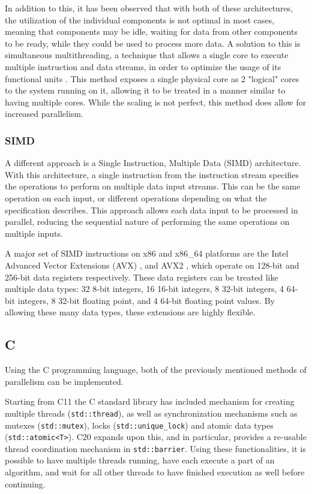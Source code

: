 \documentclass[12pt,dvipsnames]{article}
\newcommand{\icpp}[1]{\texttt{#1}}
\newcommand{\Rplus}{\protect\hspace{-.1em}\protect\raisebox{.35ex}{\smaller{\smaller\textbf{+}}}}
\newcommand{\Cpp}{\mbox{C\Rplus\Rplus}\xspace}
\newcommand{\CppXI}{\mbox{C\Rplus\Rplus11}\xspace}
\newcommand{\CppXX}{\mbox{C\Rplus\Rplus20}\xspace}
\begin{document}
In addition to this, it has been observed that with both of these architectures, the utilization of the individual components is not optimal in most cases, meaning that components may be idle, waiting for data from other components to be ready, while they could be used to process more data. A solution to this is simultaneous multithreading, a technique that allows a single core to execute multiple instruction and data streams, in order to optimize the usage of its functional units \cite{smt}. This method exposes a single physical core as 2 "logical" cores to the system running on it, allowing it to be treated in a manner similar to having multiple cores. While the scaling is not perfect, this method does allow for increased parallelism.

\clearpage

\subsubsection{SIMD}
A different approach is a Single Instruction, Multiple Data (SIMD) architecture. With this architecture, a single instruction from the instruction stream specifies the operations to perform on multiple data input streams. This can be the same operation on each input, or different operations depending on what the specification describes. This approach allows each data input to be processed in parallel, reducing the sequential nature of performing the same operations on multiple inputs.

A major set of SIMD instructions on x86 and x86\_64 platforms are the Intel Advanced Vector Extensions (AVX) \cite{Lomont11introductionto}, and AVX2 \cite{haswell}, which operate on 128-bit and 256-bit data registers respectively. These data registers can be treated like multiple data types: 32 8-bit integers, 16 16-bit integers, 8 32-bit integers, 4 64-bit integers, 8 32-bit floating point, and 4 64-bit floating point values. By allowing these many data types, these extensions are highly flexible.

\subsection{\texorpdfstring{\Cpp}{C++}}
Using the \Cpp programming language, both of the previously mentioned methods of parallelism can be implemented.

Starting from \CppXI the \Cpp standard library has included mechanism for creating multiple threads (\icpp{std::thread}), as well as synchronization mechanisms such as mutexes (\icpp{std::mutex}), locks \linebreak (\icpp{std::unique_lock}) and atomic data types (\icpp{std::atomic<T>}). \CppXX expands upon this, and in particular, provides a re-usable thread coordination mechanism in \icpp{std::barrier}. Using these functionalities, it is possible to have multiple threads running, have each execute a part of an algorithm, and wait for all other threads to have finished execution as well before continuing.
\end{document}
